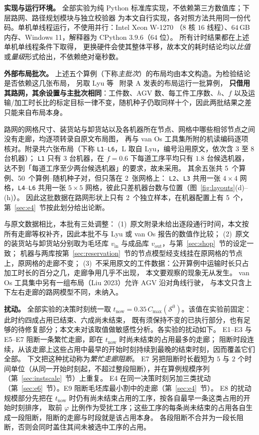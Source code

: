 \documentclass[manuscript,screen,review]{acmart}
\newcommand{\NPubInst}{5}
\newcommand{\NPubPairs}{50}
\newcommand{\NPubNets}{2}
\begin{document}
\textbf{实现与运行环境。}
全部实验为纯 Python 标准库实现，不依赖第三方数值库；下层路网、路径规划模块与独立校验器
为本文自行实现，各对照方法共用同一份代码。单机单线程运行，不使用并行：Intel Xeon W-1270
（\(8\) 核 \(16\) 线程）、\(64\)\,GB 内存、Windows 11，解释器为 CPython \(3.9.6\)（\(64\) 位）。
所有计时结果都在上述单机单线程条件下取得，
更换硬件会使其整体平移，故本文的耗时结论均以\emph{比值}或\emph{量级}形式给出，不依赖绝对毫秒数。

\textbf{外部布局批次。}
上述五个算例（下称\emph{主批次}）的布局均由本文构造。为检验结论是否依赖这几张布局，
另取 Lyu 等~\cite{lyu2019approach} 附录 A 发表的布局运行一批算例，
\textbf{只借用其路网，其余设置与主批次相同}：工件数、AGV 数、每工件工序数、\(h\)、\(f\)
以及运输/加工时长比的标定目标一律不变，随机种子仍取同样十个，因此两批结果之差只能来自布局本身。

路网的网格尺寸、装货站与卸货站以及各机器所在节点、网格中哪些相邻节点之间没有走廊，均逐项转录自原文布局图，
再与 van Os 工具集所附的机读编码逐项核对。附录共六张布局（下称 \texttt{L1}--\texttt{L6}，L 取自 Lyu，编号沿用原文，依次含 \(3\) 至 \(8\) 台机器）；
\texttt{L1} 只有 \(3\) 台机器，在 \(f=0.6\) 下每道工序平均只有 \(1.8\) 台候选机器，
达不到「每道工序至少两台候选机器」的要求，故未采用。
其余五张共 \NPubInst\ 个算例、\NPubPairs\ 个算例--随机种子对，但只落在 \NPubNets\ 张网格上：
\texttt{L2}、\texttt{L3} 共用一张 \(4\times4\) 网格，\texttt{L4}--\texttt{L6} 共用一张 \(5\times5\) 网格，彼此只差机器台数与位置（图~\ref{fig:layouts}(d)--(h)）。
因此这批数据在路网形状上只有 \NPubNets\ 个独立样本，在机器配置上有 \NPubInst\ 个，第~\ref{sec:e4}~节按此划分给出论断。

与原文数据相比，本批有三处调整：
(1)~原文附录未给出逐段通行时间，本文按所有走廊等权补齐，因此本批不与 Lyu 或 van Os 报告的数值作比较；
(2)~原文的装货站与卸货站分别取为毛坯库 \(v_{\mathrm{in}}\) 与成品库 \(v_{\mathrm{out}}\)，与第~\ref{sec:shop}~节的设定一致；
机器与两库按第~\ref{sec:reservation}~节的节点模型经支线挂在原网格的节点上，原网格的走廊不变；
(3)~不采用原文的工件数据：公开算例中运输时长只占加工时长的百分之几，走廊争用几乎不出现，
本文要观察的现象无从发生。
van Os 工具集中另有一组布局（Liu 2023）允许 AGV 沿对角线行驶，
与本文只含上下左右走廊的路网模型不同，未纳入。

\textbf{扰动。}
全部实验的决策时刻统一取 \(t_{\mathrm{now}}=0.35\,C_{\max}(\mathcal{S}^0)\)。该值在实验前固定：此时约四成占用已结束、六成尚未结束，
既有须保持不变的已执行部分，也有足够的待修复部分；本文未对该取值做敏感性分析。各实验的扰动如下。
E1--E3 与 E5--E7 阻断一条繁忙走廊，即在 \(t_{\mathrm{now}}\) 时尚未结束的占用最多的走廊；
阻断时段连续，从该走廊上这些占用中最早的开始时刻持续到最晚的结束时刻，因而覆盖它们全部。
下文把这种扰动称为\emph{繁忙走廊阻断}。
E7 另把阻断时长截短为 \(5\) 与 \(2\) 个时间单位（从同一开始时刻起，不超过整段阻断），并在算例规模序列（第~\ref{sec:instscale}~节）上重复。
E4 在同一决策时刻另加三类扰动（第~\ref{sec:e6}~节）。E9 阻断毛坯库最小割中的走廊（第~\ref{sec:e4}~节）。
E8 的扰动规模部分先把在 \(t_{\mathrm{now}}\) 时仍有尚未结束占用的工序，按各自最早一条这类占用的开始时刻排序，
取前 \(\varphi\) 比例作为受扰工序；这些工序的每条尚未结束的占用各自生成一段阻断，阻断的走廊与时段就是该占用本身。
各段阻断不合并为一段长阻断，否则会同时盖住其间未被选中工序的占用。
\end{document}
